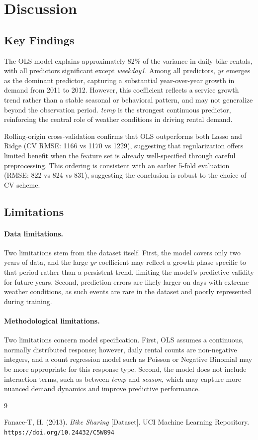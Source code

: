 \documentclass[12pt, a4paper]{article}
\begin{document}
\section{Discussion}

\subsection{Key Findings}
The OLS model explains approximately 82\% of the variance in daily bike
rentals, with all predictors significant except \textit{weekday1}.
Among all predictors, \textit{yr} emerges as the dominant predictor,
capturing a substantial year-over-year growth in demand from 2011 to
2012. However, this coefficient reflects a service growth trend rather
than a stable seasonal or behavioral pattern, and may not generalize
beyond the observation period. \textit{temp} is the strongest continuous
predictor, reinforcing the central role of weather conditions in driving
rental demand.

Rolling-origin cross-validation confirms that OLS outperforms both Lasso
and Ridge (CV RMSE: 1166 vs 1170 vs 1229), suggesting that
regularization offers limited benefit when the feature set is already
well-specified through careful preprocessing. This ordering is consistent
with an earlier 5-fold evaluation (RMSE: 822 vs 824 vs 831), suggesting
the conclusion is robust to the choice of CV scheme.

\subsection{Limitations}
\paragraph{Data limitations.}
Two limitations stem from the dataset itself. First, the model covers
only two years of data, and the large \textit{yr} coefficient may reflect
a growth phase specific to that period rather than a persistent trend,
limiting the model's predictive validity for future years. Second,
prediction errors are likely larger on days with extreme weather
conditions, as such events are rare in the dataset and poorly represented
during training.

\paragraph{Methodological limitations.}
Two limitations concern model specification. First, OLS assumes a
continuous, normally distributed response; however, daily rental counts
are non-negative integers, and a count regression model such as Poisson
or Negative Binomial may be more appropriate for this response type.
Second, the model does not include interaction terms, such as between
\textit{temp} and \textit{season}, which may capture more nuanced demand
dynamics and improve predictive performance.


\begin{thebibliography}{9}
 
Fanaee-T, H. (2013).
\textit{Bike Sharing} [Dataset].
UCI Machine Learning Repository.
\texttt{https://doi.org/10.24432/C5W894}
 
\end{thebibliography}
\end{document}
